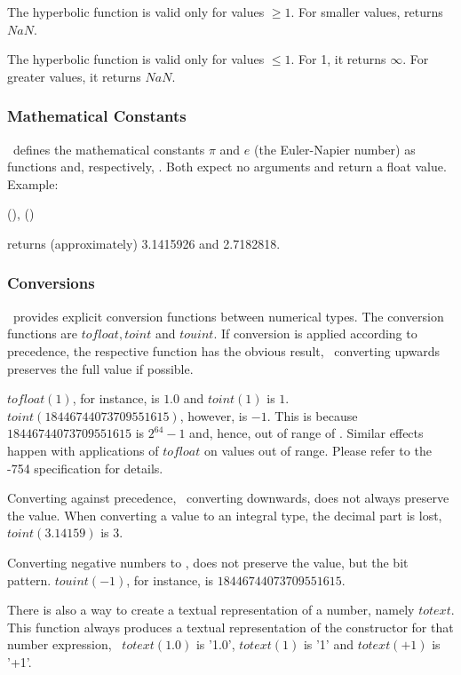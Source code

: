The hyperbolic function 
is valid only for values $\ge 1$.
For smaller values,  returns $NaN$.

The hyperbolic function 
is valid only for values $\le 1$.
For 1, it returns $\infty$.
For greater values, it returns $NaN$.

\subsubsection{Mathematical Constants}
\nowdb\ defines the mathematical constants
$\pi$ and $e$ (the Euler-Napier number) as
functions  and, respectively, .
Both expect no arguments and return a float value.
Example:

 (), ()
 

returns (approximately)
3.1415926 and
2.7182818.

\subsubsection{Conversions}
\nowdb\ provides explicit conversion functions
between numerical types. The conversion functions
are   
$tofloat, toint$ and $touint$.
If conversion is applied according to precedence,
the respective function has the obvious result,
\ie\ converting upwards preserves the full value
if possible.

$tofloat(1)$, for instance, is $1.0$ and
$toint(1)$ is $1$.
$toint(18446744073709551615)$, however, is $-1$.
This is because $18446744073709551615$ is
$2^{64}-1$ and, hence, out of range of .
Similar effects happen with applications of
$tofloat$ on values out of range.
Please refer to the 
-754 specification for details.

Converting against precedence,
\ie\ converting downwards,
does not always preserve the value.
When converting a 
value to an integral type, the decimal part
is lost, \eg\ $toint(3.14159)$ is 3.

Converting negative numbers to ,
does not preserve the value, but the bit pattern.
$touint(-1)$, for instance, is
$18446744073709551615$.

There is also a way to create a textual
representation of a number, namely $totext$.
This function always produces a textual
representation of the constructor for that
number expression,
\eg\ $totext(1.0)$ is '1.0',
$totext(1)$ is '1' and
$totext(+1)$ is '+1'.

